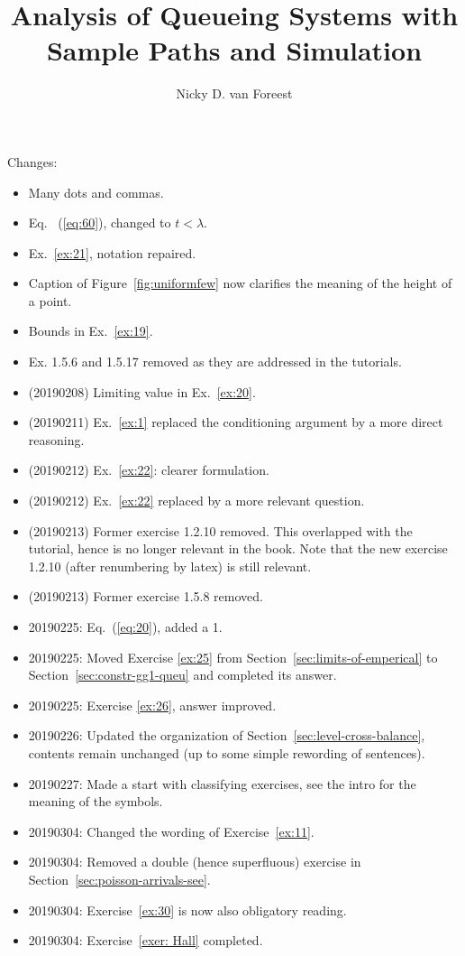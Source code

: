 \author{Nicky D. van  Foreest}
\title{Analysis of Queueing Systems with  Sample Paths and Simulation }


\maketitle

Changes:
\begin{itemize}
\item Many dots and commas. 
\item Eq. ~(\ref{eq:60}), changed to $t<\lambda$. 
\item Ex.~\ref{ex:21}, notation repaired.
\item Caption of Figure~\ref{fig:uniformfew} now clarifies the meaning of the height of a point. 
\item Bounds in Ex.~\ref{ex:19}.
\item Ex. 1.5.6 and 1.5.17 removed as they are  addressed in the tutorials. 
\item (20190208) Limiting value in Ex.~\ref{ex:20}. 
\item (20190211) Ex.~\ref{ex:1} replaced the conditioning argument by a more direct reasoning.
\item (20190212) Ex.~\ref{ex:22}: clearer formulation.
\item (20190212) Ex.~\ref{ex:22} replaced by a more relevant question.
\item (20190213) Former exercise 1.2.10 removed. This overlapped with the tutorial, hence is no longer relevant in the book. Note that the new exercise 1.2.10 (after renumbering by latex) is still relevant. 
\item (20190213) Former exercise 1.5.8 removed.
\item 20190225: Eq.~(\ref{eq:20}), added a 1.
\item 20190225: Moved Exercise \ref{ex:25} from Section~\ref{sec:limits-of-emperical} to Section~\ref{sec:constr-gg1-queu} and completed its answer.
\item 20190225:  Exercise \ref{ex:26}, answer improved.
\item 20190226:  Updated the organization of Section~\ref{sec:level-cross-balance}, contents remain unchanged (up to some simple rewording of sentences).
\item 20190227:  Made a start with classifying exercises, see the intro for the meaning of the symbols.
\item 20190304: Changed the wording of Exercise~\ref{ex:11}. 
\item 20190304: Removed a double (hence superfluous) exercise in Section~\ref{sec:poisson-arrivals-see}. 
\item 20190304: Exercise~\ref{ex:30} is now also obligatory reading.
\item 20190304: Exercise~\ref{exer: Hall} completed.
\end{itemize}

